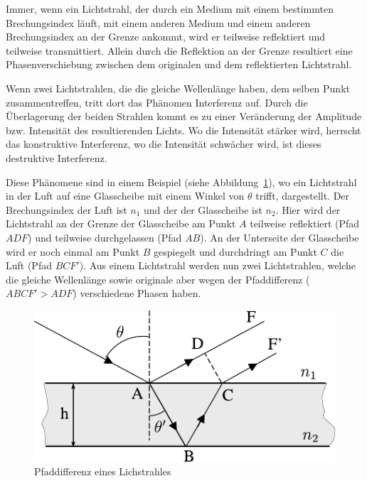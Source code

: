 Immer, wenn ein Lichtstrahl, der durch ein Medium mit einem bestimmten Brechungsindex läuft, mit einem anderen Medium und einem anderen Brechungsindex an der Grenze ankommt, wird er teilweise reflektiert und teilweise transmittiert.
Allein durch die Reflektion an der Grenze resultiert eine Phasenverschiebung zwischen dem originalen und dem reflektierten Lichtstrahl.

Wenn zwei Lichtstrahlen, die die gleiche Wellenlänge haben, dem selben Punkt zusammentreffen, tritt dort das Phänomen Interferenz auf.
Durch die Überlagerung der beiden Strahlen kommt es zu einer Veränderung der Amplitude bzw. Intensität des resultierenden Lichts.
Wo die Intensität stärker wird, herrscht das konstruktive Interferenz, wo die Intensität schwächer wird, ist dieses destruktive Interferenz.

Diese Phänomene sind in einem Beispiel (siehe Abbildung~\ref{fig:pfadabweichung_des_lichtstrahls}), wo ein Lichtstrahl in der Luft auf eine Glasscheibe mit einem Winkel von $\theta$ trifft, dargestellt.
Der Brechungsindex der Luft ist $n_1$ und der der Glasscheibe ist $n_2$.
Hier wird der Lichtstrahl an der Grenze der Glasscheibe am Punkt $A$ teilweise reflektiert (Pfad $ADF$) und teilweise durchgelassen (Pfad $AB$).
An der Unterseite der Glasscheibe wird er noch einmal am Punkt $B$ gespiegelt und durchdringt am Punkt $C$ die Luft (Pfad $BCF'$).
Aus einem Lichtstrahl werden nun zwei Lichtstrahlen, welche die gleiche Wellenlänge sowie originale aber wegen der Pfaddifferenz ($ABCF' > ADF$) verschiedene Phasen haben.

\begin{figure}[htb]
    \centering
    \includegraphics[]{./images/licht_interferenz_furtuna.pdf}
    \caption{Pfaddifferenz eines Lichstrahles~\cite{furtuna_2011}}
    \label{fig:pfadabweichung_des_lichtstrahls}
\end{figure}


